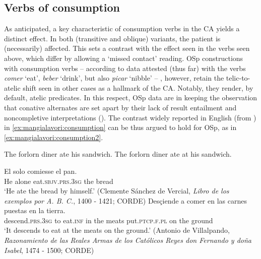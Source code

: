 \documentclass[output=paper,colorlinks,citecolor=brown,
]{langscibook}
\begin{document}
\subsection{Verbs of consumption}\label{sec:mangialavori:3-2}
As anticipated, a key characteristic of consumption verbs in the CA yields a distinct effect. In both (transitive and oblique) variants, the patient is (necessarily) affected. This sets a contrast with the effect seen in the verbs seen above, which differ by allowing a ‘missed contact’ reading. OSp constructions with consumption verbs -- according to data attested (thus far) with the verbs \textit{comer} ‘eat’, \textit{beber} ‘drink’, but also \textit{picar} ‘nibble’ -- , however, retain the telic-to-atelic shift seen in other cases as a hallmark of the CA. Notably, they render, by default, atelic predicates. In this respect, OSp data are in keeping the observation that conative alternates are set apart by their lack of result entailment and noncompletive interpretations (\citealt{Krifka1999}). The contrast widely reported in English (from \citealt[64]{Beavers2006}) in  \ref{ex:mangialavori:consumption} can be thus argued to hold for OSp, as in  \ref{ex:mangialavori:consumption2}.

\ea\label{ex:mangialavori:consumption}
  \ea The forlorn diner ate his sandwich. 
  \ex The forlorn diner ate at his sandwich. 
  \z 
\z 

\ea\label{ex:mangialavori:consumption2}
  \ea
    \gll El solo comiesse el pan.\\
He alone eat.\textsc{sbjv}.\textsc{prs}.\textsc{3sg} the bread\\
    \glt ‘He ate the bread by himself.’ (Clemente Sánchez de Vercial, \textit{Libro de los exemplos por A. B. C.}, 1400 - 1421; CORDE) 
  \ex
    \gll Desçiende a comer en las carnes puestas en la tierra.\\ 
descend.\textsc{prs}.\textsc{3sg} to eat.\textsc{inf} in the meats put.\textsc{ptcp}.\textsc{f}.\textsc{pl} on the ground\\
    \glt ‘It descends to eat at the meats on the ground.’ (Antonio de Villalpando, \textit{Razonamiento de las Reales Armas de los Católicos Reyes don Fernando y doña Isabel}, 1474 - 1500; CORDE)
  \z 
\z 
\end{document}
